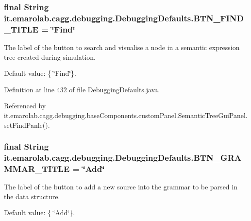 \hypertarget{classit_1_1emarolab_1_1cagg_1_1debugging_1_1DebuggingDefaults_a0e36c0c39eca88c11bcbfc1d90133a27}{
\subsubsection[{B\-T\-N\-\_\-\-F\-I\-N\-D\-\_\-\-T\-I\-T\-L\-E}]{\setlength{\rightskip}{0pt plus 5cm}final String it.\-emarolab.\-cagg.\-debugging.\-Debugging\-Defaults.\-B\-T\-N\-\_\-\-F\-I\-N\-D\-\_\-\-T\-I\-T\-L\-E = \char`\"{}Find\char`\"{}\hspace{0.3cm}{\ttfamily [static]}}}\label{classit_1_1emarolab_1_1cagg_1_1debugging_1_1DebuggingDefaults_a0e36c0c39eca88c11bcbfc1d90133a27}
The label of the button to search and visualise a node in a semantic expression tree created during simulation. \par
 Default value\-: \{ \char`\"{}\-Find\char`\"{}\}. 

Definition at line 432 of file Debugging\-Defaults.\-java.



Referenced by it.\-emarolab.\-cagg.\-debugging.\-base\-Components.\-custom\-Panel.\-Semantic\-Tree\-Gui\-Panel.\-set\-Find\-Panle().

\hypertarget{classit_1_1emarolab_1_1cagg_1_1debugging_1_1DebuggingDefaults_a0aedf6d2cb51e27c19dae8d79e71e074}{
\subsubsection[{B\-T\-N\-\_\-\-G\-R\-A\-M\-M\-A\-R\-\_\-\-T\-I\-T\-L\-E}]{\setlength{\rightskip}{0pt plus 5cm}final String it.\-emarolab.\-cagg.\-debugging.\-Debugging\-Defaults.\-B\-T\-N\-\_\-\-G\-R\-A\-M\-M\-A\-R\-\_\-\-T\-I\-T\-L\-E = \char`\"{}Add\char`\"{}\hspace{0.3cm}{\ttfamily [static]}}}\label{classit_1_1emarolab_1_1cagg_1_1debugging_1_1DebuggingDefaults_a0aedf6d2cb51e27c19dae8d79e71e074}
The label of the button to add a new source into the grammar to be parsed in the data structure. \par
 Default value\-: \{ \char`\"{}\-Add\char`\"{}\}. 

